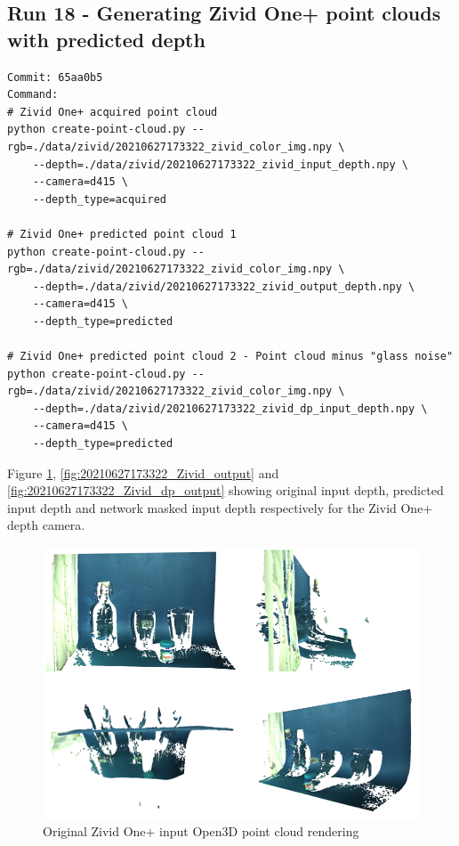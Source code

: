\subsection{Run 18 - Generating Zivid One+ point clouds with predicted depth}
\label{app_res:18}

\begin{verbatim}
Commit: 65aa0b5
Command: 
# Zivid One+ acquired point cloud
python create-point-cloud.py --rgb=./data/zivid/20210627173322_zivid_color_img.npy \ 
    --depth=./data/zivid/20210627173322_zivid_input_depth.npy \ 
    --camera=d415 \ 
    --depth_type=acquired

# Zivid One+ predicted point cloud 1
python create-point-cloud.py --rgb=./data/zivid/20210627173322_zivid_color_img.npy \ 
    --depth=./data/zivid/20210627173322_zivid_output_depth.npy \ 
    --camera=d415 \ 
    --depth_type=predicted

# Zivid One+ predicted point cloud 2 - Point cloud minus "glass noise"
python create-point-cloud.py --rgb=./data/zivid/20210627173322_zivid_color_img.npy \ 
    --depth=./data/zivid/20210627173322_zivid_dp_input_depth.npy \ 
    --camera=d415 \ 
    --depth_type=predicted

\end{verbatim}

Figure \ref{fig:20210627173322_Zivid_input}, \ref{fig:20210627173322_Zivid_output} and \ref{fig:20210627173322_Zivid_dp_output} showing original input depth, predicted input depth and network masked input depth respectively for the Zivid One+ depth camera.

\begin{figure}[h!]
\centering
\includegraphics[width=\textwidth]{Figures/20210627173322_Zivid_input.png}
\caption{Original Zivid One+ input Open3D point cloud rendering}
\label{fig:20210627173322_Zivid_input}
\end{figure}

